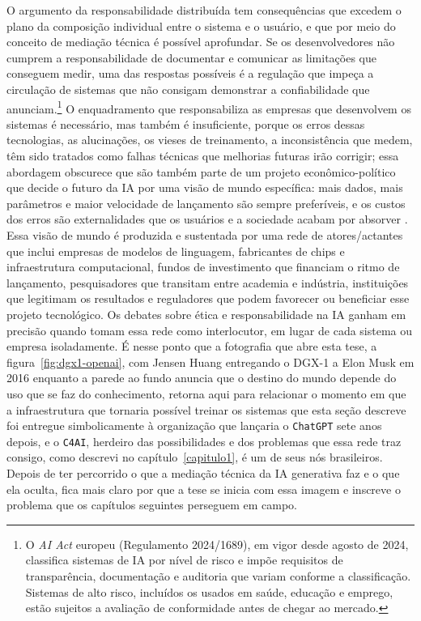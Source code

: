 O argumento da responsabilidade distribuída tem consequências que excedem o plano da composição individual entre o sistema e o usuário, e que por meio do conceito de mediação técnica é possível aprofundar. Se os desenvolvedores não cumprem a responsabilidade de documentar e comunicar as limitações que conseguem medir, uma das respostas possíveis é a regulação que impeça a circulação de sistemas que não consigam demonstrar a confiabilidade que anunciam.\footnote{O \emph{AI Act} europeu (Regulamento 2024/1689), em vigor desde agosto de 2024, classifica sistemas de IA por nível de risco e impõe requisitos de transparência, documentação e auditoria que variam conforme a classificação. Sistemas de alto risco, incluídos os usados em saúde, educação e emprego, estão sujeitos a avaliação de conformidade antes de chegar ao mercado.} O enquadramento que responsabiliza as empresas que desenvolvem os sistemas é necessário, mas também é insuficiente, porque os erros dessas tecnologias, as alucinações, os vieses de treinamento, a inconsistência que \textcite{Pinhanez2025Small} medem, têm sido tratados como falhas técnicas que melhorias futuras irão corrigir; essa abordagem obscurece que são também parte de um projeto econômico-político que decide o futuro da IA por uma visão de mundo específica: mais dados, mais parâmetros e maior velocidade de lançamento são sempre preferíveis, e os custos dos erros são externalidades que os usuários e a sociedade acabam por absorver \parencite{Brennan2025ArtificialPower}. Essa visão de mundo é produzida e sustentada por uma rede de atores/actantes que inclui empresas de modelos de linguagem, fabricantes de chips e infraestrutura computacional, fundos de investimento que financiam o ritmo de lançamento, pesquisadores que transitam entre academia e indústria, instituições que legitimam os resultados e reguladores que podem favorecer ou beneficiar esse projeto tecnológico. Os debates sobre ética e responsabilidade na IA ganham em precisão quando tomam essa rede como interlocutor, em lugar de cada sistema ou empresa isoladamente. É nesse ponto que a fotografia que abre esta tese, a figura~\ref{fig:dgx1-openai}, com Jensen Huang entregando o DGX-1 a Elon Musk em 2016 enquanto a parede ao fundo anuncia que o destino do mundo depende do uso que se faz do conhecimento, retorna aqui para relacionar o momento em que a infraestrutura que tornaria possível treinar os sistemas que esta seção descreve foi entregue simbolicamente à organização que lançaria o \texttt{ChatGPT} sete anos depois, e o \texttt{C4AI}, herdeiro das possibilidades e dos problemas que essa rede traz consigo, como descrevi no capítulo~\ref{capitulo1}, é um de seus nós brasileiros. Depois de ter percorrido o que a mediação técnica da IA generativa faz e o que ela oculta, fica mais claro por que a tese se inicia com essa imagem e inscreve o problema que os capítulos seguintes perseguem em campo.

